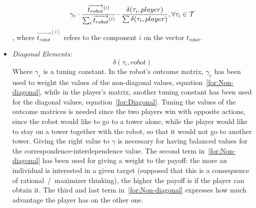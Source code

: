 \begin{itemize}
\begin{equation}
\label{for:Non-diagonal}
\gamma_r \cdot \frac{\overrightarrow{t_{robot}}^{(i)}}{\sum_{i}{\overrightarrow{t_{robot}}^{(i)}}} \cdot \frac{\delta(\tau_{i},player)}{\sum{\delta(\tau_{i},player)}}, \forall\tau_{i} \in \mathcal{T}\\ 
\end{equation}
, where $\overrightarrow{t_{robot}}^{(i)}$ refers to the component $i$ on the vector $t_{robot}$.
\item \textit{Diagonal Elements:}
\begin{equation}
\label{for:Diagonal}
\delta(\tau_{i},robot)
\end{equation}
Where $\gamma_r$ is a tuning constant. In the robot's outcome matrix, $\gamma_r$ has been used to weight the values of the non-diagonal values, equation~\ref{for:Non-diagonal}, while in the player's matrix, another tuning constant has been used for the diagonal values, equation~\ref{for:Diagonal}. Tuning the values of the outcome matrices is needed since the two players win with opposite actions, since the robot would like to go to a tower alone, while the player would like to stay on a tower together with the robot, so that it would not go to another tower. Giving the right value to $\gamma$ is necessary for having balanced values for the correspondence-interdependence value.
The second term in~\ref{for:Non-diagonal} has been used for giving a weight to the payoff: the more an individual is interested in a given target (supposed that this is a consequence of rational~/~maximizer thinking), the higher the payoff is if the player can obtain it.
The third and last term in~\ref{for:Non-diagonal} expresses how much advantage the player has on the other one.
\end{itemize}

